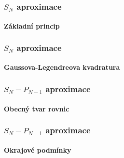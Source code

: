 \begin{frame}
  \frametitle{$S_N$ aproximace}
  \framesubtitle{Základní princip}  


\end{frame}

\begin{frame}
  \frametitle{$S_N$ aproximace}
  \framesubtitle{Gaussova-Legendreova kvadratura}  


\end{frame}

\begin{frame}
  \frametitle{$S_N-P_{N-1}$ aproximace}
  \framesubtitle{Obecný tvar rovnic}  


\end{frame}

\begin{frame}
  \frametitle{$S_N-P_{N-1}$ aproximace}
  \framesubtitle{Okrajové podmínky}  


\end{frame}
